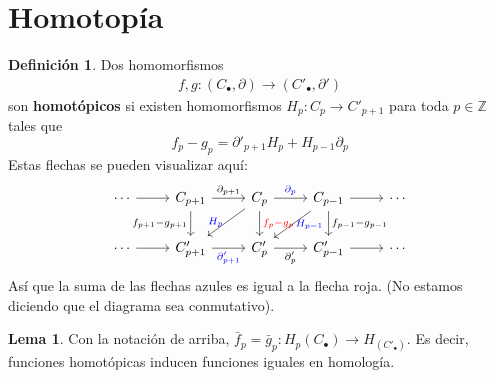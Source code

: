 \documentclass[spanish]{book}
\theoremstyle{definition}
\newtheorem*{defn}{Definición}
\newtheorem*{lema}{Lema}
\newcommand{\Z}{\mathbb{Z}}
\begin{document}
	\section{Homotopía}
	\begin{defn}
		Dos homomorfismos 
		\begin{align*}
			f,g:(C_\bullet,\partial)\to(C'_\bullet,\partial')
		\end{align*}
		son \textbf{homotópicos} si existen homomorfismos $H_p:C_p\to C'_{p+1}$ para toda $p\in\Z$ tales que $$f_p-g_p=\partial'_{p+1}H_p+H_{p-1}\partial_p$$ Estas flechas se pueden visualizar aquí:
		\[
		\begin{tikzcd}
			\cdots \arrow{r} & C_{p+1} \arrow{r}{\partial_{p+1}} \arrow{d}[left]{f_{p+1}-g_{p+1}} & C_p \arrow{r}[blue]{\partial_p} \arrow{d}[right,red]{f_p-g_p} \arrow{ld}[left,blue]{H_p} & C_{p-1} \arrow{r} \arrow{d}[right]{f_{p-1}-g_{p-1}} \arrow{ld}[right,blue]{H_{p-1}} & \cdots \\
			\cdots \arrow{r} & C'_{p+1} \arrow{r}[below,blue]{\partial'_{p+1}} & C'_p \arrow{r}[below]{\partial_p'} & C'_{p-1} \arrow{r} & \cdots
		\end{tikzcd}
		\]
		Así que la suma de las flechas azules es igual a la flecha roja. (No estamos diciendo que el diagrama sea conmutativo).
	\end{defn}
	\begin{lema}
		Con la notación de arriba, $\bar f_p=\bar g_p:H_p(C_\bullet)\to H_(C'_\bullet)$. Es decir, funciones homotópicas inducen funciones iguales en homología.
	\end{lema}
\end{document}

